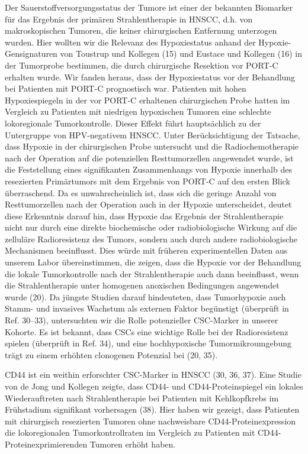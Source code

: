 Der Sauerstoffversorgungsstatus der Tumore ist einer der bekannten Biomarker für das Ergebnis der primären Strahlentherapie in HNSCC, d.h. von makroskopischen Tumoren, die keiner chirurgischen Entfernung unterzogen wurden. Hier wollten wir die Relevanz des Hypoxiestatus anhand der Hypoxie-Gensignaturen von Toustrup und Kollegen (15) und Eustace und Kollegen (16) in der Tumorprobe bestimmen, die durch chirurgische Resektion vor PORT-C erhalten wurde. Wir fanden heraus, dass der Hypoxiestatus vor der Behandlung bei Patienten mit PORT-C prognostisch war. Patienten mit hohen Hypoxiespiegeln in der vor PORT-C erhaltenen chirurgischen Probe hatten im Vergleich zu Patienten mit niedrigen hypoxischen Tumoren eine schlechte lokoregionale Tumorkontrolle. Dieser Effekt führt hauptsächlich zu der Untergruppe von HPV-negativem HNSCC. Unter Berücksichtigung der Tatsache, dass Hypoxie in der chirurgischen Probe untersucht und die Radiochemotherapie nach der Operation auf die potenziellen Resttumorzellen angewendet wurde, ist die Feststellung eines signifikanten Zusammenhangs von Hypoxie innerhalb des resezierten Primärtumors mit dem Ergebnis von PORT-C auf den ersten Blick überraschend. Da es unwahrscheinlich ist, dass sich die geringe Anzahl von Resttumorzellen nach der Operation auch in der Hypoxie unterscheidet, deutet diese Erkenntnis darauf hin, dass Hypoxie das Ergebnis der Strahlentherapie nicht nur durch eine direkte biochemische oder radiobiologische Wirkung auf die zelluläre Radioresistenz des Tumors, sondern auch durch andere radiobiologische Mechanismen beeinflusst. Dies würde mit früheren experimentellen Daten aus unserem Labor übereinstimmen, die zeigen, dass die Hypoxie vor der Behandlung die lokale Tumorkontrolle nach der Strahlentherapie auch dann beeinflusst, wenn die Strahlentherapie unter homogenen anoxischen Bedingungen angewendet wurde (20). Da jüngste Studien darauf hindeuteten, dass Tumorhypoxie auch Stamm- und invasives Wachstum als externen Faktor begünstigt (überprüft in Ref. 30--33), untersuchten wir die Rolle potenzieller CSC-Marker in unserer Kohorte. Es ist bekannt, dass CSCs eine wichtige Rolle bei der Radioresistenz spielen (überprüft in Ref. 34), und eine hochhypoxische Tumormikroumgebung trägt zu einem erhöhten clonogenen Potenzial bei (20, 35).

CD44 ist ein weithin erforschter CSC-Marker in HNSCC (30, 36, 37). Eine Studie von de Jong und Kollegen zeigte, dass CD44- und CD44-Proteinspiegel ein lokales Wiederauftreten nach Strahlentherapie bei Patienten mit Kehlkopfkrebs im Frühstadium signifikant vorhersagen (38). Hier haben wir gezeigt, dass Patienten mit chirurgisch resezierten Tumoren ohne nachweisbare CD44-Proteinexpression die lokoregionalen Tumorkontrollraten im Vergleich zu Patienten mit CD44-Proteinexprimierenden Tumoren erhöht haben.

